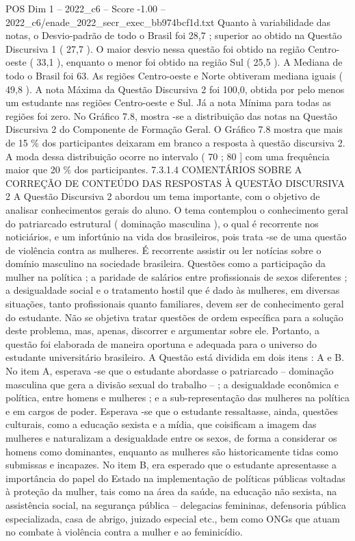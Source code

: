 \begin{textsample}{POS Dim 1 – 2022\_c6 – Score -1.00 – 2022\_c6/enade\_2022\_secr\_exec\_bb974bcf1d.txt}
Quanto à variabilidade das notas, o Desvio-padrão de todo o Brasil foi 28,7 ; superior ao obtido na Questão Discursiva 1 ( 27,7 ).
O maior desvio nessa questão foi obtido na região Centro-oeste ( 33,1 ), enquanto o menor foi obtido na região Sul ( 25,5 ).
A Mediana de todo o Brasil foi 63.
As regiões Centro-oeste e Norte obtiveram mediana iguais ( 49,8 ).
A nota Máxima da Questão Discursiva 2 foi 100,0, obtida por pelo menos um estudante nas regiões Centro-oeste e Sul.
Já a nota Mínima para todas as regiões foi zero.
No Gráfico 7.8, mostra -se a distribuição das notas na Questão Discursiva 2 do Componente de Formação Geral.
O Gráfico 7.8 mostra que mais de 15 \% dos participantes deixaram em branco a resposta à questão discursiva 2.
A moda dessa distribuição ocorre no intervalo ( 70 ; 80 ] com uma frequência maior que 20 \% dos participantes. 7.3.1.4 COMENTÁRIOS SOBRE A CORREÇÃO DE CONTEÚDO DAS RESPOSTAS À QUESTÃO DISCURSIVA 2 A Questão Discursiva 2 abordou um tema importante, com o objetivo de analisar conhecimentos gerais do aluno.
O tema contemplou o conhecimento geral do patriarcado estrutural ( dominação masculina ), o qual é recorrente nos noticiários, e um infortúnio na vida dos brasileiros, pois trata -se de uma questão de violência contra as mulheres.
É recorrente assistir ou ler notícias sobre o domínio masculino na sociedade brasileira.
Questões como a participação da mulher na política ; a paridade de salários entre profissionais de sexos diferentes ; a desigualdade social e o tratamento hostil que é dado às mulheres, em diversas situações, tanto profissionais quanto familiares, devem ser de conhecimento geral do estudante.
Não se objetiva tratar questões de ordem específica para a solução deste problema, mas, apenas, discorrer e argumentar sobre ele.
Portanto, a questão foi elaborada de maneira oportuna e adequada para o universo do estudante universitário brasileiro.
A Questão está dividida em dois itens : A e B.
No item A, esperava -se que o estudante abordasse o patriarcado – dominação masculina que gera a divisão sexual do trabalho – ; a desigualdade econômica e política, entre homens e mulheres ; e a sub-representação das mulheres na política e em cargos de poder.
Esperava -se que o estudante ressaltasse, ainda, questões culturais, como a educação sexista e a mídia, que coisificam a imagem das mulheres e naturalizam a desigualdade entre os sexos, de forma a considerar os homens como dominantes, enquanto as mulheres são historicamente tidas como submissas e incapazes.
No item B, era esperado que o estudante apresentasse a importância do papel do Estado na implementação de políticas públicas voltadas à proteção da mulher, tais como na área da saúde, na educação não sexista, na assistência social, na segurança pública – delegacias femininas, defensoria pública especializada, casa de abrigo, juizado especial etc., bem como ONGs que atuam no combate à violência contra a mulher e ao feminicídio.

\end{textsample}

